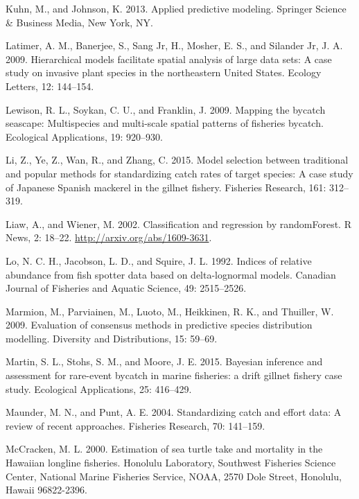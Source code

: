 \documentclass[]{article}
\begin{document}
\hypertarget{ref-kuhn2013}{}
Kuhn, M., and Johnson, K. 2013. Applied predictive modeling. Springer
Science \& Business Media, New York, NY.

\hypertarget{ref-latimer2009}{}
Latimer, A. M., Banerjee, S., Sang Jr, H., Mosher, E. S., and Silander
Jr, J. A. 2009. Hierarchical models facilitate spatial analysis of large
data sets: A case study on invasive plant species in the northeastern
United States. Ecology Letters, 12: 144--154.

\hypertarget{ref-lewison2009}{}
Lewison, R. L., Soykan, C. U., and Franklin, J. 2009. Mapping the
bycatch seascape: Multispecies and multi-scale spatial patterns of
fisheries bycatch. Ecological Applications, 19: 920--930.

\hypertarget{ref-li2015}{}
Li, Z., Ye, Z., Wan, R., and Zhang, C. 2015. Model selection between
traditional and popular methods for standardizing catch rates of target
species: A case study of Japanese Spanish mackerel in the gillnet
fishery. Fisheries Research, 161: 312--319.

\hypertarget{ref-liaw2002}{}
Liaw, A., and Wiener, M. 2002. Classification and regression by
randomForest. R News, 2: 18--22. \url{http://arxiv.org/abs/1609-3631}.

\hypertarget{ref-lo1992}{}
Lo, N. C. H., Jacobson, L. D., and Squire, J. L. 1992. Indices of
relative abundance from fish spotter data based on delta-lognormal
models. Canadian Journal of Fisheries and Aquatic Science, 49:
2515--2526.

\hypertarget{ref-marmion2009}{}
Marmion, M., Parviainen, M., Luoto, M., Heikkinen, R. K., and Thuiller,
W. 2009. Evaluation of consensus methods in predictive species
distribution modelling. Diversity and Distributions, 15: 59--69.

\hypertarget{ref-martin2015}{}
Martin, S. L., Stohs, S. M., and Moore, J. E. 2015. Bayesian inference
and assessment for rare-event bycatch in marine fisheries: a drift
gillnet fishery case study. Ecological Applications, 25: 416--429.

\hypertarget{ref-maunder2004}{}
Maunder, M. N., and Punt, A. E. 2004. Standardizing catch and effort
data: A review of recent approaches. Fisheries Research, 70: 141--159.

\hypertarget{ref-mccracken2000}{}
McCracken, M. L. 2000. Estimation of sea turtle take and mortality in
the Hawaiian longline fisheries. Honolulu Laboratory, Southwest
Fisheries Science Center, National Marine Fisheries Service, NOAA, 2570
Dole Street, Honolulu, Hawaii 96822-2396.
\end{document}
